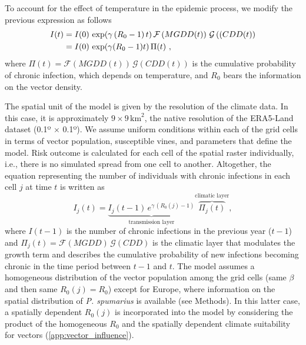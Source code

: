To account for the effect of temperature in the epidemic process, we modify
the previous expression as follows
\begin{align}
    \label{eq:final_eq}
    I(t) & =I(0)\, \exp(\gamma\, (R_0-1)\, t)\,
    \mathcal{F}\left(MGDD(t)\right)\,
    \mathcal{G}\left((CDD(t)\right) \nonumber
    \\
         & =I(0)\, \exp(\gamma(R_0-1)t)\, \Pi(t) \ ,
\end{align}
where $\Pi(t)=\mathcal{F}(MGDD(t))\, \mathcal{G}(CDD(t))$ is the cumulative
probability of chronic infection, which depends on temperature, and $R_0$ bears
the information on the vector density.

The spatial unit of the model is given by the resolution of the climate data.
In this case, it is approximately $9 \times 9\,  \textrm{km}^2$, the native
resolution of the ERA5-Land dataset (0.1º $\times$ 0.1º). We assume uniform
conditions within each of the grid cells in terms of vector population,
susceptible vines, and parameters that define the
model. Risk outcome is calculated for each cell of the spatial raster
individually, i.e., there is no simulated spread from one cell to another.
Altogether, the equation representing the number of individuals with chronic
infections in each cell $j$ at time $t$ is written as
\begin{equation}\label{eq:evolution_eq}
    I_j(t)=\underbrace{I_j(t-1) \, e^{\gamma \,
                (R_0(j)-1)}}_\text{transmission
        layer}	  \overbrace{\Pi_j(t)}^\text{climatic layer} ,
\end{equation}
where $I(t-1)$ is the number of chronic infections in the previous year
($t-1$) and $\Pi_j(t)=\mathcal{F}(MGDD)\, \mathcal{G}(CDD)$ is the climatic
layer that modulates the growth term and describes the cumulative probability
of new infections becoming chronic in the time period between $t-1$ and $t$.
The model assumes a homogeneous distribution of the vector population among
the grid cells (same $\beta$ and then same $R_0(j) = R_0$) except for Europe,
where information on the spatial distribution of \textit{P. spumarius} is
available (see Methods). In this latter case, a spatially dependent $R_0(j)$ is
incorporated into the model by considering the product of the homogeneous
$R_0$ and the spatially dependent climate suitability for vectors
(\cref{app:vector_influence}).

